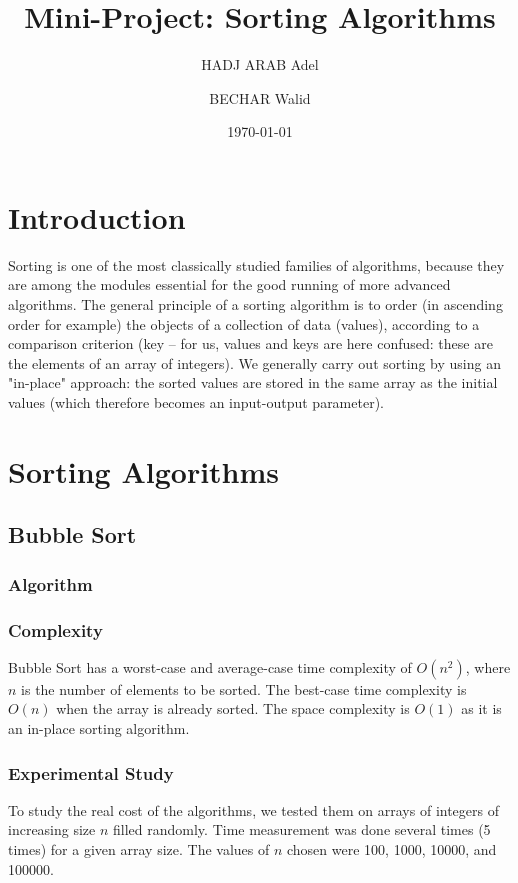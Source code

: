 \documentclass{article}
\title{Mini-Project: Sorting Algorithms}
\author{HADJ ARAB Adel \and BECHAR Walid}
\date{\today}
\begin{document}
\maketitle

\section{Introduction}
Sorting is one of the most classically studied families of algorithms, because they are among the modules essential for the good running of more advanced algorithms. The general principle of a sorting algorithm is to order (in ascending order for example) the objects of a collection of data (values), according to a comparison criterion (key – for us, values and keys are here confused: these are the elements of an array of integers). We generally carry out sorting by using an "in-place" approach: the sorted values are stored in the same array as the initial values (which therefore becomes an input-output parameter).

\section{Sorting Algorithms}

\subsection{Bubble Sort}

\subsubsection{Algorithm}

\subsubsection{Complexity}
Bubble Sort has a worst-case and average-case time complexity of $O(n^2)$, where $n$ is the number of elements to be sorted. The best-case time complexity is $O(n)$ when the array is already sorted. The space complexity is $O(1)$ as it is an in-place sorting algorithm.

\subsubsection{Experimental Study}
To study the real cost of the algorithms, we tested them on arrays of integers of increasing size $n$ filled randomly. Time measurement was done several times (5 times) for a given array size. The values of $n$ chosen were 100, 1000, 10000, and 100000.
\end{document}
